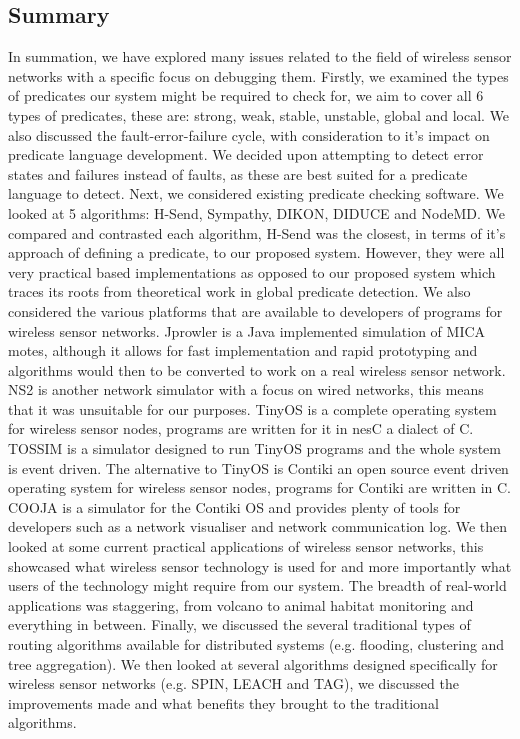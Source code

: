 \subsection{Summary}
In summation, we have explored many issues related to the field of wireless sensor networks with a specific focus on debugging them. Firstly, we examined the types of predicates our system might be required to check for, we aim to cover all 6 types of predicates, these are: strong, weak, stable, unstable, global and local. We also discussed the fault-error-failure cycle, with consideration to it's impact on predicate language development. We decided upon attempting to detect error states and failures instead of faults, as these are best suited for a predicate language to detect. Next, we considered existing predicate checking software. We looked at 5 algorithms: H-Send, Sympathy, DIKON, DIDUCE and NodeMD. We compared and contrasted each algorithm, H-Send was the closest, in terms of it's approach of defining a predicate, to our proposed system. However, they were all very practical based implementations as opposed to our proposed system which traces its roots from theoretical work in global predicate detection. We also considered the various platforms that are available to developers of programs for wireless sensor networks. Jprowler is a Java implemented simulation of MICA motes, although it allows for fast implementation and rapid prototyping and algorithms would then to be converted to work on a real wireless sensor network. NS2 is another network simulator with a focus on wired networks, this means that it was unsuitable for our purposes. TinyOS is a complete operating system for wireless sensor nodes, programs are written for it in nesC a dialect of C. TOSSIM is a simulator designed to run TinyOS programs and the whole system is event driven. The alternative to TinyOS is Contiki an open source event driven operating system for wireless sensor nodes, programs for Contiki are written in C. COOJA is a simulator for the Contiki OS and provides plenty of tools for developers such as a network visualiser and network communication log. We then looked at some current practical applications of wireless sensor networks, this showcased what wireless sensor technology is used for and more importantly what users of the technology might require from our system. The breadth of real-world applications was staggering, from volcano to animal habitat monitoring and everything in between. Finally, we discussed the several traditional types of routing algorithms available for distributed systems (e.g. flooding, clustering and tree aggregation). We then looked at several algorithms designed specifically for wireless sensor networks (e.g. SPIN, LEACH and TAG), we discussed the improvements made and what benefits they brought to the traditional algorithms.
